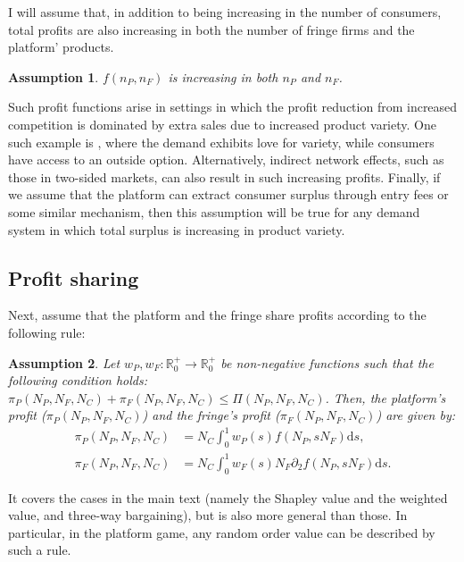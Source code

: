 \documentclass[a4paper]{article}
\newtheorem{assumption}{Assumption}
\newcommand{\ds}{\mathrm{d}s}
\begin{document}
I will assume that, in addition to being increasing in the number of consumers, total profits are also increasing in both the number of fringe firms and the platform' products.
\begin{assumption}
    \label{ass:monotone_profits}
    $f(n_P, n_F)$ is increasing in both $n_P$ and $n_F$.
\end{assumption}
Such profit functions arise in settings in which the profit reduction from increased competition is dominated by extra sales due to increased product variety.
One such example is \textcite{anderson2020aggregative}, where the demand exhibits love for variety, while consumers have access to an outside option.
Alternatively, indirect network effects, such as those in two-sided markets, can also result in such increasing profits.
Finally, if we assume that the platform can extract consumer surplus through entry fees or some similar mechanism, then this assumption will be true for any demand system in which total surplus is increasing in product variety.

\subsection{Profit sharing}
\label{sec:more_general_profit_sharing}
Next, assume that the platform and the fringe share profits according to the following rule:
\begin{assumption}
    \label{ass:profit_sharing}
    Let $w_P, w_F: \mathbb{R}^+_0 \to \mathbb{R}^+_0$ be non-negative functions such that the following condition holds: $\pi_P(N_P, N_F, N_C) + \pi_F(N_P, N_F, N_C) \leq \Pi(N_P, N_F, N_C)$.
    Then, the platform's profit ($\pi_P(N_P, N_F, N_C)$) and the fringe's profit ($\pi_F(N_P, N_F, N_C)$) are given by:
    \begin{align*}
        \pi_P(N_P, N_F, N_C) &= N_C \int_0^1 w_P(s) f(N_P, s N_F) \ds, \\
        \pi_F(N_P, N_F, N_C) &= N_C \int_0^1 w_F(s) N_F \partial_2 f(N_P, s N_F) \ds.
    \end{align*}
\end{assumption}
It covers the cases in the main text (namely the Shapley value and the weighted value, and three-way bargaining), but is also more general than those.
In particular, in the platform game, any random order value \parencite{weber1988probabilistic} can be described by such a rule.
\end{document}
